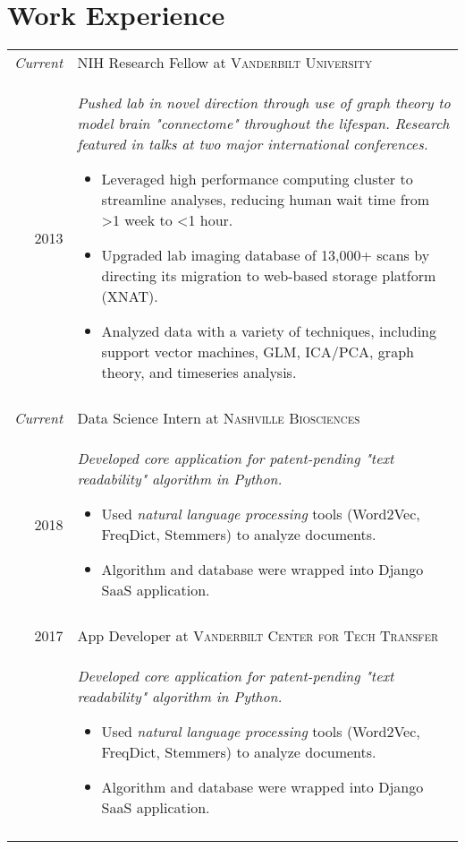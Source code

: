 \documentclass[a4paper,11pt]{article}
\begin{document}
\section{Work Experience}
\begin{longtable}{r|p{11cm}}
 	\emph{Current} & NIH Research Fellow at \textsc{Vanderbilt University} \\*
 	2013 & \small{\emph{Pushed lab in novel direction  through use of graph theory to model brain "connectome" throughout the lifespan. Research featured in talks at two major international conferences. }}	\href{https://ww5.aievolution.com/hbm1801/index.cfm?do=ev.viewEv&ev=1362}{\color{blue}\Mundus} \footnotesize{
 	\begin{itemize}[itemsep=1pt,topsep=2pt]
    	\item Leveraged high performance computing cluster to streamline analyses, reducing human wait time from \textgreater 1 week to \textless 1 hour.
    	\item Upgraded lab imaging database of 13,000+ scans by directing its migration to web-based storage platform (XNAT).
    	\item Analyzed data with a variety of techniques, including support vector machines, GLM, ICA/PCA, graph theory, and timeseries analysis.
	\end{itemize} } \\*
	\\
    
    
	\emph{Current} & Data Science Intern at \textsc{Nashville Biosciences} \\*
	2018 & \small{\emph{Developed core application for patent-pending "text readability" algorithm in Python.}}
	\footnotesize{
	\begin{itemize}[itemsep=1pt,topsep=2pt]
	    \item Used \textit{natural language processing} tools (Word2Vec, FreqDict, Stemmers) to analyze documents.
	    \item Algorithm and database were wrapped into Django SaaS application.
    \end{itemize}}\\*
	 \\
 	
    
	2017 & App Developer at \textsc{Vanderbilt Center for Tech Transfer} \\*
	& \small{\emph{Developed core application for patent-pending "text readability" algorithm in Python.}}
	\footnotesize{
	\begin{itemize}[itemsep=1pt,topsep=2pt]
	    \item Used \textit{natural language processing} tools (Word2Vec, FreqDict, Stemmers) to analyze documents.
	    \item Algorithm and database were wrapped into Django SaaS application.
    \end{itemize}}\\*
 	 \\




\end{longtable}
\end{document}
